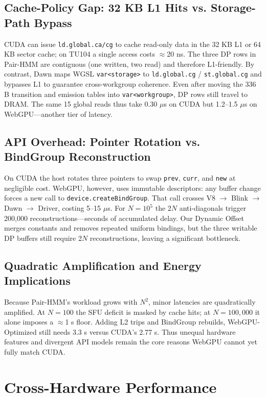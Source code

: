 \documentclass[PhD]{PHlab-thesis}
\begin{document}
\subsection{Cache-Policy Gap: 32 KB L1 Hits vs. Storage-Path Bypass}
CUDA can issue \texttt{ld.global.ca/cg} to cache read-only data in the 32 KB L1 or 64 KB sector cache; on TU104 a single access costs $\approx$20 ns.
The three DP rows in Pair-HMM are contiguous (one written, two read) and therefore L1-friendly.
By contrast, Dawn maps WGSL \texttt{var<storage>} to \texttt{ld.global.cg} / \texttt{st.global.cg} and bypasses L1 to guarantee cross-workgroup coherence.
Even after moving the 336 B transition and emission tables into \texttt{var<workgroup>}, DP rows still travel to DRAM.
The same 15 global reads thus take 0.30 $\mu$s on CUDA but 1.2–1.5 $\mu$s on WebGPU—another tier of latency.

\subsection{API Overhead: Pointer Rotation vs. BindGroup Reconstruction}
On CUDA the host rotates three pointers to swap \texttt{prev}, \texttt{curr}, and \texttt{new} at negligible cost.
WebGPU, however, uses immutable descriptors: any buffer change forces a new call to \texttt{device.createBindGroup}.
That call crosses V8 $\rightarrow$ Blink $\rightarrow$ Dawn $\rightarrow$ Driver, costing 5–15 $\mu$s.
For $N=10^5$ the 2$N$ anti-diagonals trigger 200,000 reconstructions—seconds of accumulated delay.
Our Dynamic Offset merges constants and removes repeated uniform bindings, but the three writable DP buffers still require 2$N$ reconstructions, leaving a significant bottleneck.

\subsection{Quadratic Amplification and Energy Implications}
Because Pair-HMM’s workload grows with $N^2$, minor latencies are quadratically amplified.
At $N=100$ the SFU deficit is masked by cache hits; at $N=100,000$ it alone imposes a $\approx$1 s floor.
Adding L2 trips and BindGroup rebuilds, WebGPU-Optimized still needs 3.3 s versus CUDA’s 2.77 s.
Thus unequal hardware features and divergent API models remain the core reasons WebGPU cannot yet fully match CUDA.

\section{Cross-Hardware Performance}
\end{document}
